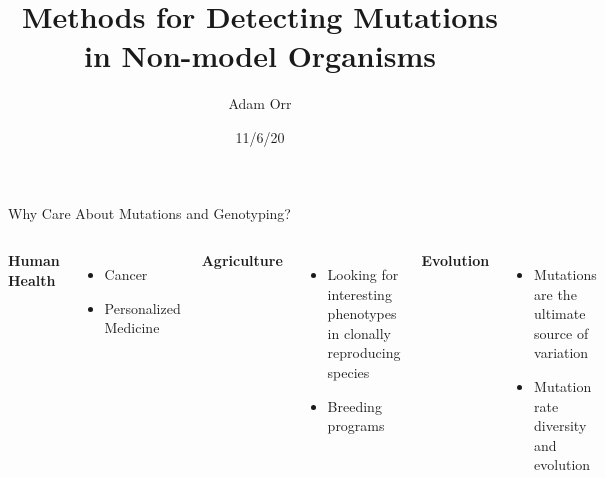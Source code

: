 \documentclass[table]{beamer}
\title[Mutations in Non-model Organisms]{Methods for Detecting Mutations in Non-model Organisms}
\date{11/6/20}
\author{Adam Orr}
\begin{document}
\frame{\titlepage}

\begin{frame}{Why Care About Mutations and Genotyping?}
\begin{columns}

\textbf{Human Health}
\begin{itemize}
\item Cancer
\item Personalized Medicine
\end{itemize}

\vfill

\textbf{Agriculture}
\begin{itemize}
\item Looking for interesting phenotypes in clonally reproducing species
\item Breeding programs
\end{itemize}

\textbf{Evolution}
\begin{itemize}
\item Mutations are the ultimate source of variation
\item Mutation rate diversity and evolution
\end{itemize}

\includegraphics[width=\linewidth]{nectarine.jpg}

\end{columns}
\end{frame}
\end{document}
